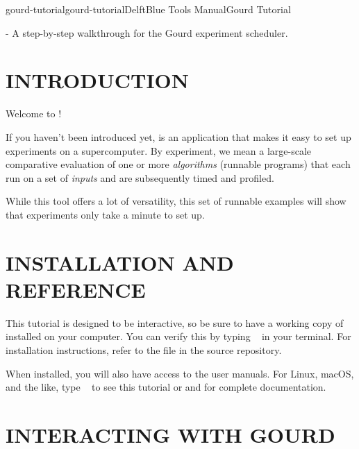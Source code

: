 \documentclass[a4paper,english]{article}
\begin{document}
    \pagestyle{fancy}

    \begin{Name}{7}{gourd-tutorial}{gourd-tutorial}{DelftBlue Tools Manual}{Gourd Tutorial}
\begin{adjustwidth}{18pt}{0pt}

         - A step-by-step walkthrough for the Gourd experiment scheduler.

\end{adjustwidth}
    \end{Name}

\begin{adjustwidth}{18pt}{0pt}

    \section{INTRODUCTION}

    Welcome to !

    If you haven't been introduced yet,  is an application that makes it easy
    to set up experiments on a supercomputer.
    By experiment, we mean a large-scale comparative evaluation of one or more
    \emph{algorithms} (runnable programs) that each run on a set of \emph{inputs} and are
    subsequently timed and profiled.

    While this tool offers a lot of versatility, this set of runnable examples will show
    that  experiments only take a minute to set up.

    \section{INSTALLATION AND REFERENCE}

    This tutorial is designed to be interactive, so be sure to have a working copy of
     installed on your computer.
    You can verify this by typing ~ in your terminal.
    For installation instructions, refer to the  file in the source
    repository.

    When installed, you will also have access to the user manuals.
    For Linux, macOS, and the like, type ~ to see this
    tutorial or  and  for complete documentation.

    \section{INTERACTING WITH GOURD}


\end{adjustwidth}
\end{document}
